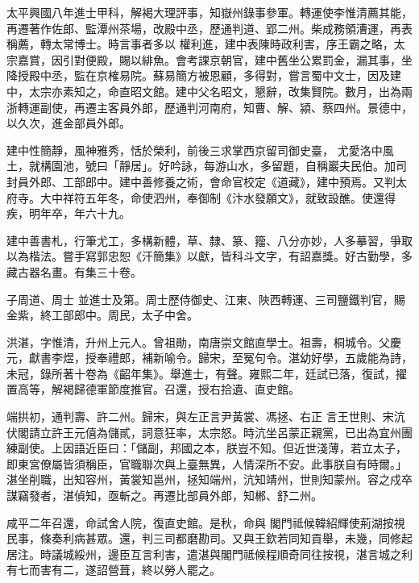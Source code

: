\begin{pinyinscope}
 太平興國八年進士甲科，解褐大理評事，知嶽州錄事參軍。轉運使李惟清薦其能，再遷著作佐郎、監潭州茶場，改殿中丞，歷通判道、郢二州。柴成務領漕運，再表稱薦，轉太常博士。時言事者多以
 權利進，建中表陳時政利害，序王霸之略，太宗嘉賞，因引對便殿，賜以緋魚。會考課京朝官，建中舊坐公累罰金，漏其事，坐降授殿中丞，監在京榷易院。蘇易簡方被恩顧，多得對，嘗言蜀中文士，因及建中，太宗亦素知之，命直昭文館。建中父名昭文，懇辭，改集賢院。數月，出為兩浙轉運副使，再遷主客員外郎，歷通判河南府，知曹、解、潁、蔡四州。景德中，以久次，進金部員外郎。



 建中性簡靜，風神雅秀，恬於榮利，前後三求掌西京留司御史臺，
 尤愛洛中風土，就構園池，號曰「靜居」。好吟詠，每游山水，多留題，自稱巖夫民伯。加司封員外郎、工部郎中。建中善修養之術，會命官校定《道藏》，建中預焉。又判太府寺。大中祥符五年冬，命使泗州，奉御制《汴水發願文》，就致設醮。使還得疾，明年卒，年六十九。



 建中善書札，行筆尤工，多構新體，草、隸、篆、籀、八分亦妙，人多摹習，爭取以為楷法。嘗手寫郭忠恕《汗簡集》以獻，皆科斗文字，有詔嘉獎。好古勤學，多藏古器名畫。有集三十卷。



 子周道、周士
 並進士及第。周士歷侍御史、江東、陜西轉運、三司鹽鐵判官，賜金紫，終工部郎中。周民，太子中舍。



 洪湛，字惟清，升州上元人。曾祖勛，南唐崇文館直學士。祖壽，桐城令。父慶元，獻書李煜，授奉禮郎，補新喻令。歸宋，至冤句令。湛幼好學，五歲能為詩，未冠，錄所著十卷為《齠年集》。舉進士，有聲。雍熙二年，廷試已落，復試，擢置高等，解褐歸德軍節度推官。召還，授右拾遺、直史館。



 端拱初，通判壽、許二州。歸宋，與左正言尹黃裳、馮拯、右正
 言王世則、宋沆伏閣請立許王元僖為儲貳，詞意狂率，太宗怒。時沆坐呂蒙正親黨，已出為宜州團練副使。上因語近臣曰：「儲副，邦國之本，朕豈不知。但近世淺薄，若立太子，即東宮僚屬皆須稱臣，官職聯次與上臺無異，人情深所不安。此事朕自有時爾。」湛坐削職，出知容州，黃裳知邕州，拯知端州，沆知靖州，世則知蒙州。容之戍卒謀竊發者，湛偵知，亟斬之。再遷比部員外郎，知郴、舒二州。



 咸平二年召還，命試舍人院，復直史館。是秋，命與
 閣門祗候韓紹輝使荊湖按視民事，條奏利病甚眾。還，判三司都磨勘司。又與王欽若同知貢舉，未幾，同修起居注。時議城綏州，邊臣互言利害，遣湛與閣門祗候程順奇同往按視，湛言城之利有七而害有二，遂詔營葺，終以勞人罷之。




\end{pinyinscope}
